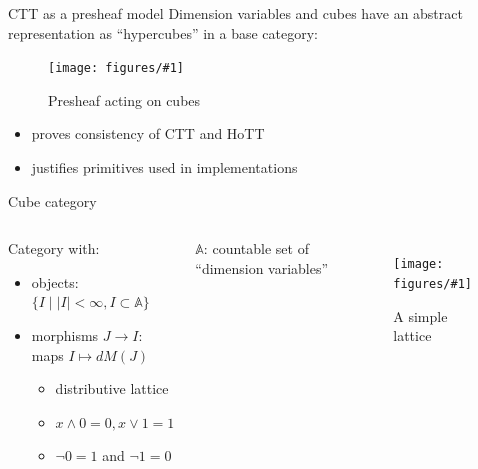 \documentclass[english]{beamer}
\newcommand{\fig}[2]{
    \begin{figure}\begin{center}\texttt{[image: figures/\#1]}\caption{#2\label{#1}}\end{center}
    \end{figure}}
\begin{document}
\begin{frame}{CTT as a presheaf model}
    Dimension variables and cubes have an abstract representation as ``hypercubes'' in a base category:
    
    \fig{cube_presheaf}{Presheaf acting on cubes}

    \begin{itemize}
        \item proves consistency of CTT and HoTT
        \item justifies primitives used in implementations
    \end{itemize}
    
\end{frame}

\begin{frame}{Cube category}

%  
%  


  \begin{columns}[c]
        
    \begin{definition}
    Category with:
        \begin{itemize}
            \item objects: $\{ I \mid |I| < \infty , I \subset \mathbb{A} \}$
            \item morphisms $J\rightarrow I$: maps $I \mapsto dM(J)$
            \begin{itemize}
                \item distributive lattice
                \item  $x \wedge 0 = 0, x\vee 1 = 1$
                \item $\neg 0 = 1$ and $ \neg 1 =0$
            \end{itemize}
        \end{itemize}
        \end{definition}
$\mathbb{A}$: countable set of ``dimension variables'' 
        \fig{lattice}{A simple lattice}
\end{columns}
 
 
\end{frame}
\end{document}
